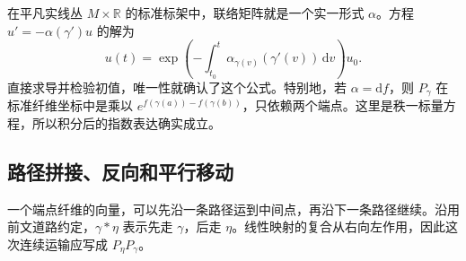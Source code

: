 \begin{example}\label{g1:exm:line-connection-transport}
	在平凡实线丛 \(M\times\mathbb R\) 的标准标架中，联络矩阵就是一个实一形式 \(\alpha\)。方程 \(u'=-\alpha(\gamma')u\) 的解为
	\[
		u(t)=\exp\left(-\int_{t_0}^t \alpha_{\gamma(v)}(\gamma'(v))\,\mathrm{d}v\right)u_0.
	\]
	直接求导并检验初值，唯一性就确认了这个公式。特别地，若 \(\alpha=\mathrm{d}f\)，则 \(P_\gamma\) 在标准纤维坐标中是乘以 \(e^{f(\gamma(a))-f(\gamma(b))}\)，只依赖两个端点。这里是秩一标量方程，所以积分后的指数表达确实成立。
\end{example}

\subsection{路径拼接、反向和平行移动}
\label{g1:subsec:1502:02}

一个端点纤维的向量，可以先沿一条路径运到中间点，再沿下一条路径继续。沿用前文道路约定，\(\gamma*\eta\) 表示先走 \(\gamma\)，后走 \(\eta\)。线性映射的复合从右向左作用，因此这次连续运输应写成 \(P_\eta P_\gamma\)。

